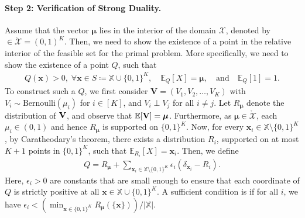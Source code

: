 \documentclass{article}
\theoremstyle{plain}
\theoremstyle{definition}
\newcommand{\calX}{\mathcal X}
\newcommand{\xvec}{\mathbf{x}}
\newcommand{\qtext}[1]{\quad \text{#1} \quad}
\newcommand{\boldmu}{\boldsymbol{\mu}}
\newcommand{\finitesupport}{\mathbb{X}}
\begin{document}
\paragraph{Step 2: Verification of Strong Duality.}  
Assume that the vector $\boldmu$ lies in the interior of the domain $\calX$, denoted by $\in \mathring{\calX} = (0,1)^K$. Then, we need to show the existence of a point in the relative interior of the feasible set for the primal problem. More specifically, we need to show the existence of a point $Q$, such that 
\begin{align}
    Q(\xvec)>0, \; \forall \xvec \in S \coloneqq \finitesupport \cup \{0, 1\}^K, \quad \mathbb{E}_Q[X] = \boldmu, \qtext{and} \mathbb{E}_Q[1] = 1. 
\end{align}
To construct such a $Q$, we first consider $\mathbf{V} = (V_1, V_2, \ldots, V_K)$ with $V_i \sim \mathrm{Bernoulli}(\mu_i)$ for $i \in [K]$, and $V_i \perp V_j$ for all $i \neq j$. Let $R_{\boldmu}$ denote the distribution of $\bf{V}$, and observe that $\mathbb{E}[\bf{V}] = \boldmu$. Furthermore,  as $\boldmu \in \mathring{\calX}$, each $\mu_i \in (0, 1)$ and hence $R_{\boldmu}$ is supported on $\{0,1\}^K$. Now, for every $\xvec_i \in \finitesupport \setminus \{0,1\}^K$, by Caratheodary's theorem, there exists a distribution $R_i$, supported on at most $K+1$ points in $\{0,1\}^K$, such that $\mathbb{E}_{R_i}[X] = \xvec_i$. Then, we define 
\begin{align}
    Q = R_{\boldmu} + \sum_{\xvec_i \in \finitesupport \setminus \{0,1\}^K} \epsilon_i (\delta_{\xvec_i} - R_i). 
\end{align}
Here, $\epsilon_i>0$ are constants that are small enough to ensure that each coordinate of $Q$ is strictly positive at all $\xvec \in \finitesupport \cup \{0,1\}^K$. A sufficient condition is if for all $i$, we have $\epsilon_i < (\min_{\xvec \in \{0,1\}^K} R_{\boldmu}(\{\xvec\}))/|\finitesupport|$. 
\end{document}
